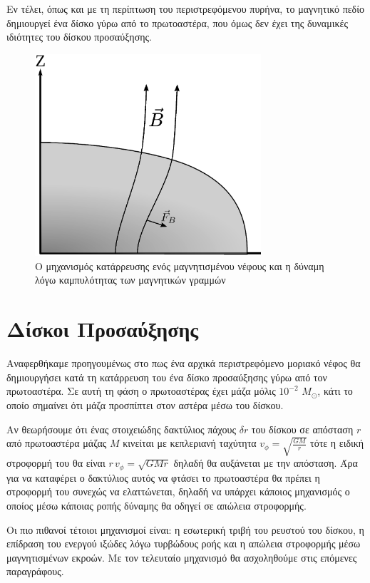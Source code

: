 \documentclass[a4paper,12pt]{memoir}
\newcommand{\sm}{$M_{\odot}$}
\begin{document}
Εν τέλει, όπως και με τη περίπτωση του περιστρεφόμενου πυρήνα, το μαγνητικό πεδίο δημιουργεί ένα δίσκο γύρω από το πρωτοαστέρα, που όμως δεν έχει της δυναμικές ιδιότητες του δίσκου προσαύξησης.


\begin{figure}[h!]
	\centering
	\includegraphics[height=7.5cm]{images/magnetic_collapse.ps}
	\caption{Ο μηχανισμός κατάρρευσης ενός μαγνητισμένου νέφους και η δύναμη λόγω καμπυλότητας των μαγνητικών γραμμών}
\end{figure}


\section{Δίσκοι Προσαύξησης}
Αναφερθήκαμε προηγουμένως στο πως ένα αρχικά περιστρεφόμενο μοριακό νέφος θα δημιουργήσει κατά τη κατάρρευση του ένα δίσκο προσαύξησης γύρω από τον πρωτοαστέρα. Σε αυτή τη φάση ο πρωτοαστέρας έχει μάζα μόλις $10^{-2}$ \sm, κάτι το οποίο σημαίνει ότι μάζα προσπίπτει στον αστέρα μέσω του δίσκου.

Αν θεωρήσουμε ότι ένας στοιχειώδης δακτύλιος πάχους $\delta r$ του δίσκου σε απόσταση $r$ από πρωτοαστέρα μάζας $M$ κινείται με κεπλεριανή ταχύτητα $v_{\phi}=\sqrt{\frac{GM}{r}}$ τότε η ειδική στροφορμή του θα είναι $r \, v_{\phi}=\sqrt{GMr}$ δηλαδή θα αυξάνεται με την απόσταση. Άρα για να καταφέρει ο δακτύλιος αυτός να φτάσει το πρωτοαστέρα θα πρέπει η στροφορμή του συνεχώς να ελαττώνεται, δηλαδή να υπάρχει κάποιος μηχανισμός ο οποίος μέσω κάποιας ροπής δύναμης θα οδηγεί σε απώλεια στροφορμής.

Οι πιο πιθανοί τέτοιοι μηχανισμοί είναι: η εσωτερική τριβή του ρευστού του δίσκου, η επίδραση του ενεργού ιξώδες λόγω τυρβώδους ροής και η απώλεια στροφορμής μέσω μαγνητισμένων εκροών.
Με τον τελευταίο μηχανισμό θα ασχοληθούμε στις επόμενες παραγράφους.
\end{document}
